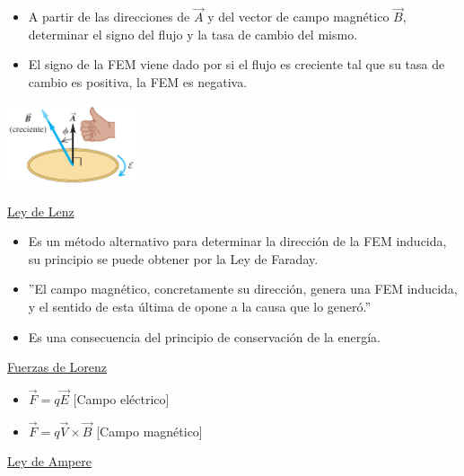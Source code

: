 \documentclass[a4paper]{article}
\newcommand{\saltoPag}{\newpage \noindent \thispagestyle{fancy}}
\begin{document}
\begin{multicols}{2}
\begin{itemize}
                        \item A partir de las direcciones de $\vec{A}$ y del vector de campo magnético $\vec{B}$, determinar el signo del flujo y la tasa de cambio del mismo.
                        \item El signo de la FEM viene dado por si el flujo es creciente tal que su tasa de cambio es positiva, la FEM es negativa.
                    \end{itemize}
                    \begin{center} \includegraphics[width=4cm]{../imagenes/direccionFEMInducida.png} \end{center}
                \underline{Ley de Lenz} \\[10pt]
                    \begin{itemize}
                        \item Es un método alternativo para determinar la dirección de la FEM inducida, su principio se puede obtener por la Ley de Faraday.
                        \item ''El campo magnético, concretamente su dirección, genera una FEM inducida, y el sentido de esta última de opone a la causa que lo generó.''
                        \item Es una consecuencia del principio de conservación de la energía.
                    \end{itemize}
                    \saltoPag
                \underline{Fuerzas de Lorenz} \\[10pt]
                    \begin{itemize}
                        \item $\vec{F} = q \vec{E}$ \hspace{5mm} [Campo eléctrico] \\[5pt]
                        \item $\vec{F} = q\vec{V} \times \vec{B}$ \hspace{5mm}[Campo magnético] \\[5pt]
                    \end{itemize}
                \underline{Ley de Ampere} \\[10pt]
                    \begin{itemize}

\end{itemize}
\end{multicols}
\end{document}
